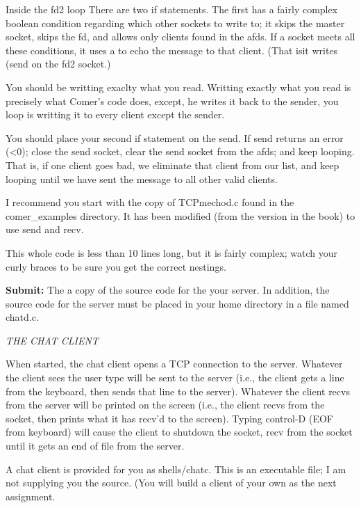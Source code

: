 Inside the {\ltt{}fd2} loop
There are two {\ltt{}if} statements.
The first has a fairly complex boolean condition regarding which
other sockets to write to; it skips the master socket,
skips the {\ltt{}fd}, and allows  only clients found in
the {\ltt{}afds}.
If a socket meets all these conditions, it uses a
to echo the message to that client.
(That isit writes ({\ltt{}send}
on the {\ltt{}fd2} socket.)

You should be writting exaclty what you read.
Writting exactly what you read is precisely what Comer's code does,
except, he writes it back to the sender, you loop is writting
it to every client except the sender.

You should place your second {\ltt{}if} statement on the {\ltt{}send}.
If {\ltt{}send} returns an error ({\ltt{}<0}); close the send socket,
clear the send socket from the {\ltt{}afds}; and keep looping.
That is, if one client goes bad, we eliminate that client from
our list, and keep looping until we have sent the message to 
all other valid clients.

I recommend you start with the copy of
{\ltt{}TCPmechod.c} found in the {\ltt{}comer_examples} directory.
It has been modified (from the version in the book)
to use {\ltt{}send} and {\ltt{}recv}.

This whole code is less than 10 lines long, but it is fairly complex;
watch your curly braces to be sure you get the correct nestings.

{\bf Submit:} The a copy of the source code for the your server.
In addition,
the source code for the server must be placed in your home directory
in a file named {\ltt{}chatd.c}.

{\it THE CHAT CLIENT}

When started, the chat client opens a TCP connection to the server.
Whatever the client sees the user type will be sent to the server 
(i.e., the client gets a line from the keyboard, 
then sends that line to the server).
Whatever the client recvs from the server will be printed on the screen
(i.e., the client recvs from the socket, 
then prints what it has recv'd to the screen).
Typing control-D (EOF from keyboard) will cause the client to 
shutdown the socket, recv from the socket until it gets an end of file
from the server.

A chat client is provided for you as {\ltt{}shells/chatc}.
This is an executable file; I am not supplying you the source.
(You will build a client of your own as the next assignment.

\bye
